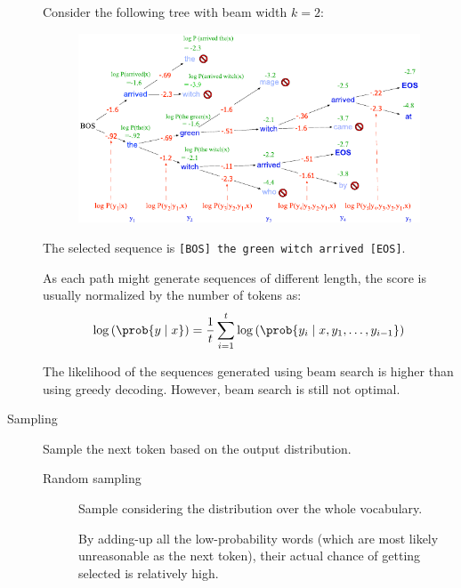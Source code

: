 \begin{description}
        \begin{example}
            Consider the following tree with beam width $k=2$:
            \begin{figure}[H]
                \centering
                \includegraphics[width=0.7\linewidth]{./img/_beam_search.pdf}
            \end{figure}
            The selected sequence is \texttt{[BOS] the green witch arrived [EOS]}.
        \end{example}

        \begin{remark}
            As each path might generate sequences of different length, the score is usually normalized by the number of tokens as:
            \[ \log\left( \prob{y \mid x} \right) = \frac{1}{t} \sum_{i=1}^{t} \log\left( \prob{ y_i \mid x, y_1, \dots, y_{i-1} } \right) \]
        \end{remark}

        \begin{remark}
            The likelihood of the sequences generated using beam search is higher than using greedy decoding. However, beam search is still not optimal.
        \end{remark}

    \item[Sampling] 
        Sample the next token based on the output distribution.

        \begin{description}
            \item[Random sampling]
                Sample considering the distribution over the whole vocabulary.

                \begin{remark}
                    By adding-up all the low-probability words (which are most likely unreasonable as the next token), their actual chance of getting selected is relatively high.
                \end{remark}


\end{description}
\end{description}
